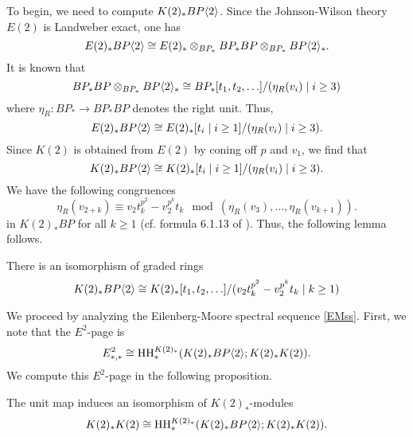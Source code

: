 To begin, we need to compute $K(2)_*BP\langle 2 \rangle$. 
Since the Johnson-Wilson theory $E(2)$ is Landweber exact, one has 
\[
E(2)_*BP\langle 2 \rangle\cong E(2)_*\otimes_{BP_*}BP_*BP\otimes_{BP_*}BP\langle 2 \rangle_*.
\]
It is known that 
\[
BP_*BP\otimes_{BP_*}BP\langle 2 \rangle_*\cong BP_*[t_1, t_2, \ldots]/(\eta_R(v_i)\mid i\geq 3)
\]
where $\eta_R:BP_*\to BP_*BP$ denotes the right unit. Thus, 
\[
E(2)_*BP\langle 2 \rangle  \cong E(2)_*[t_i\mid i\ge 1]/(\eta_R(v_i)\mid i\geq 3).
\]
Since $K(2)$ is obtained from $E(2)$ by coning off $p$ and $v_1$, we find that 
\[
K(2)_*BP\langle 2 \rangle\cong K(2)_*[t_i\mid i\ge 1]/(\eta_R(v_i)\mid i\geq 3).
\]
We have the following congruences
\[
\eta_R(v_{2+k})\equiv v_2t_k^{p^2}-v_2^{p^{k}}t_k \mod (\eta_R(v_{3}), \ldots , \eta_R(v_{k+1})).
\]
in $K(2)_*BP$ for all $k\geq 1$ (cf. formula 6.1.13 of \cite{greenbook}). Thus, the following lemma follows.
\begin{lem}
	There is an isomorphism of graded rings
	\begin{equation}
	K(2)_*BP\langle 2 \rangle\cong K(2)_*[t_1, t_2, \ldots ]/(v_2t_k^{p^2}-v_2^{p^k}t_k\mid k\geq 1)
	\end{equation}
\end{lem}

We proceed by analyzing the Eilenberg-Moore spectral sequence \eqref{EMss}. First, we note that the $E^2$-page is
\[
E^2_{*,*}\cong \operatorname{HH}_*^{K(2)_*}(K(2)_*BP\langle 2 \rangle;K(2)_*K(2)).
\]
We compute this $E^2$-page in the following proposition. 

\begin{thm}\label{thm: HH of K(2)R}
	The unit map induces an isomorphism of $K(2)_*$-modules
	\[
	K(2)_*K(2) \cong \operatorname{HH}^{K(2)_*}_*(K(2)_*BP\langle 2 \rangle;K(2)_*K(2)).
	\]
\end{thm}

